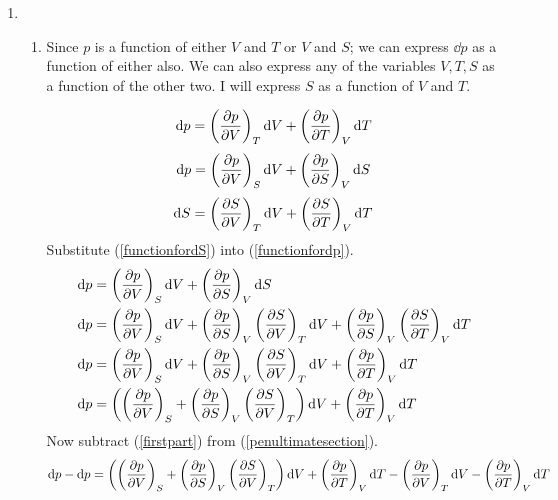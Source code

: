 \documentclass[10pt,\jkfside,a4paper]{article}
\begin{document}
\begin{enumerate}
\item 

\begin{enumerate}

\item 

Since $p$ is a function of either $V$ and $T$ or $V$ and $S$; we 
can express $\dd{p}$ as a function of either also. We can also express 
any of the variables $V, T, S$ as a function of the other two. I will 
express $S$ as a function of $V$ and $T$.

\begin{equation}\label{firstpart}
\dd{p} = \left(\pdv{p}{V}\right)_T\dd{V} + \left(\pdv{p}{T}\right)_V\dd{T} \\
\end{equation}
\begin{equation}\label{functionfordp}
\dd{p} = \left(\pdv{p}{V}\right)_S\dd{V} + \left(\pdv{p}{S}\right)_V\dd{S} \\
\end{equation}
\begin{equation}\label{functionfordS}
\dd{S} = \left(\pdv{S}{V}\right)_T\dd{V} + \left(\pdv{S}{T}\right)_V\dd{T} \\
\end{equation}
Substitute (\ref{functionfordS}) into (\ref{functionfordp}).
\begin{equation}\label{penultimatesection}
\begin{split}
\dd{p} &= \left(\pdv{p}{V}\right)_S\dd{V} + \left(\pdv{p}{S}\right)_V\dd{S} \\
\dd{p} &= \left(\pdv{p}{V}\right)_S\dd{V} + \left(\pdv{p}{S}\right)_V\left(\pdv{S}{V}\right)_T\dd{V} + \left(\pdv{p}{S}\right)_V\left(\pdv{S}{T}\right)_V\dd{T} \\
\dd{p} &= \left(\pdv{p}{V}\right)_S\dd{V} + \left(\pdv{p}{S}\right)_V\left(\pdv{S}{V}\right)_T\dd{V} + \left(\pdv{p}{T}\right)_V\dd{T} \\
\dd{p} &= \left(\left(\pdv{p}{V}\right)_S + \left(\pdv{p}{S}\right)_V\left(\pdv{S}{V}\right)_T\right)\dd{V} + \left(\pdv{p}{T}\right)_V\dd{T} \\
\end{split}
\end{equation}
Now subtract (\ref{firstpart}) from (\ref{penultimatesection}).
\begin{equation}
\begin{split}
\dd{p} - \dd{p} &= \left(\left(\pdv{p}{V}\right)_S + \left(\pdv{p}{S}\right)_V\left(\pdv{S}{V}\right)_T\right)\dd{V} + \left(\pdv{p}{T}\right)_V\dd{T} - \left(\pdv{p}{V}\right)_T\dd{V} - \left(\pdv{p}{T}\right)_V\dd{T} \\

\end{split}
\end{equation}
\end{enumerate}
\end{enumerate}
\end{document}
